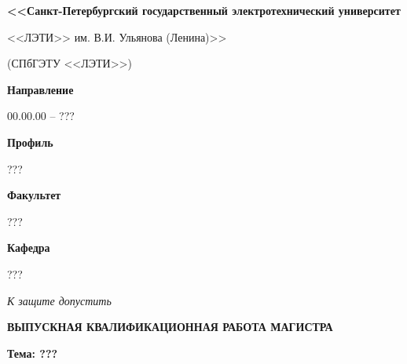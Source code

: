 \documentclass[../main]{subfiles}
\begin{document}
\begin{titlepage}
    \centering
    
    {\bfseries\small
        <<Санкт-Петербургский государственный электротехнический университет

        <<ЛЭТИ>> им. В.И. Ульянова (Ленина)>>
        
        (СПбГЭТУ <<ЛЭТИ>>)
    }

    \vspace{1cm}
    
    \textbf{Направление}\hfill\begin{minipage}[t]{12cm}
        00.00.00 -- ???
    \end{minipage}

    \textbf{Профиль}\hfill\begin{minipage}[t]{12cm}
        ???
    \end{minipage}\newline
    
    \textbf{Факультет}\hfill\begin{minipage}[t]{12cm}
        ???
    \end{minipage}
    
    \textbf{Кафедра}\hfill\begin{minipage}[t]{12cm}
        ???
    \end{minipage}
    
    \vspace{1cm}

    \textit{К защите допустить}\hspace{\fill}
    
    \hfill
    \hfill
     
    
    \vspace{1cm}
    
    \MakeUppercase{\bfseries\large
        выпускная квалификационная работа магистра
    }

    {\bfseries
        Тема: ???
    }

    \vfill

    \hfill 
     

    \vspace{4mm}
    

\end{titlepage}
\end{document}
